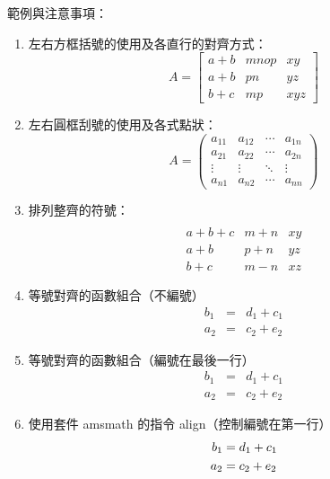 範例與注意事項：
\begin{enumerate}
  \item 左右方框括號的使用及各直行的對齊方式：
        $$ A = \left[
            \begin{array}{clr}
                a+b & mnop  & xy \\
                a+b & pn    & yz \\
                b+c & mp    & xyz
            \end{array} \right] $$

  \item 左右圓框刮號的使用及各式點狀：
        $$ A=\left(
            \begin{array}{cccc}
                a_{11} 	& a_{12} & \cdots 	& a_{1n}\\
                a_{21} 	& a_{22} & \cdots 	& a_{2n}\\
                \vdots 	& \vdots & \ddots	& \vdots\\
                a_{n1} 	& a_{n2} & \cdots 	& a_{nn}
            \end{array} \right) $$

  \item 排列整齊的符號：
        $$ \begin{array}{clr}\\
            a+b+c   & m+n 	& xy \\
            a+b     & p+n 	& yz \\
            b+c     & m-n 	& xz
        \end{array} $$

    \item 等號對齊的函數組合（不編號）
        \begin{eqnarray*}
          b_1 &=& d_1+c_1 \\
          a_2 &=& c_2+e_2
        \end{eqnarray*}

    \item 等號對齊的函數組合（編號在最後一行）
        \begin{eqnarray}
\nonumber b_1 &=& d_1+c_1 \\
          a_2 &=& c_2+e_2
        \end{eqnarray}

    \item 使用套件 {\A amsmath} 的指令 {\A align}（控制編號在第一行）
        \begin{align}
            b_1 &= d_1+c_1\\
            a_2 &= c_2+e_2 \notag
        \end{align}


\end{enumerate}

